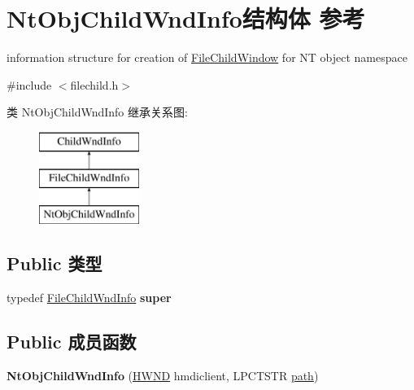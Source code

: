 \hypertarget{struct_nt_obj_child_wnd_info}{}\section{Nt\+Obj\+Child\+Wnd\+Info结构体 参考}
\label{struct_nt_obj_child_wnd_info}


information structure for creation of \hyperlink{struct_file_child_window}{File\+Child\+Window} for NT object namespace  




{\ttfamily \#include $<$filechild.\+h$>$}

类 Nt\+Obj\+Child\+Wnd\+Info 继承关系图\+:\begin{figure}[H]
\begin{center}
\leavevmode
\includegraphics[height=3.000000cm]{struct_nt_obj_child_wnd_info}
\end{center}
\end{figure}
\subsection*{Public 类型}
\begin{DoxyCompactItemize}
\item 
\mbox{\label{struct_nt_obj_child_wnd_info_af0213d6dd40d5535f5d9f204c5676a72}} 
typedef \hyperlink{struct_file_child_wnd_info}{File\+Child\+Wnd\+Info} {\bfseries super}
\end{DoxyCompactItemize}
\subsection*{Public 成员函数}
\begin{DoxyCompactItemize}
\item 
\mbox{\label{struct_nt_obj_child_wnd_info_a7a2b6168da0c1877faff591ee5a45d5e}} 
{\bfseries Nt\+Obj\+Child\+Wnd\+Info} (\hyperlink{interfacevoid}{H\+W\+ND} hmdiclient, L\+P\+C\+T\+S\+TR \hyperlink{structpath}{path})
\end{DoxyCompactItemize}
